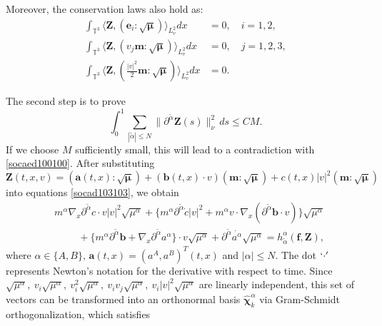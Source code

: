 \documentclass[reqno]{amsart}
\numberwithin{equation}{section}
\numberwithin{equation}{section}
\begin{document}
		Moreover, the conservation laws also hold as:
		\begin{equation}\label{conseerlawFZZ}
			\begin{aligned}
				\int_{\mathbb{T}^3} \big\langle \mathbf{Z}, (\mathbf{e}_i:\sqrt{\bm{\mu}}) \big\rangle_{L_v^2}  dx  &= 0, \quad i=1,2,\\
				\int_{\mathbb{T}^3} \big\langle \mathbf{Z}, (v_j \mathbf{m}:\sqrt{\bm{\mu}}) \big\rangle_{L_v^2} dx &= 0, \quad j=1,2,3,\\
				\int_{\mathbb{T}^3} \big\langle \mathbf{Z}, (\frac{|v|^2}{2}\mathbf{m} :\sqrt{\bm{\mu}})  \big\rangle_{L_v^2}dx &= 0.
			\end{aligned}
		\end{equation}
		
		The second step is to prove 
		\begin{equation*}
			\int_{0}^{1} \sum_{|\tilde{\alpha}| \leq N} \|\partial^{\tilde{\alpha}} \mathbf{Z}(s)\|^{2}_{\nu} \,ds \leq C M.
		\end{equation*}
		If we choose $M$ sufficiently small, this will lead to a contradiction with \eqref{socaed100100}. After substituting
		\begin{equation*}
		\mathbf{Z}(t,x,v)	= (\mathbf{a}(t,x):\sqrt{\bm{\mu}}) + (\mathbf{b}(t,x) \cdot v) (\mathbf{m}:\sqrt{\bm{\mu}}) + c(t,x)|v|^2(\mathbf{m}:\sqrt{\bm{\mu}})
		\end{equation*}
		 into equations \eqref{socad103103}, we obtain
		\begin{equation}
		\begin{aligned}
			&m^{\alpha}\nabla_{x}\partial^{\tilde{\alpha}} c \cdot v|v|^{2}\sqrt{\mu^{\alpha}} +  \{m^{\alpha}\partial^{\tilde{\alpha}} \dot{c}|v|^{2} +m^{\alpha}v \cdot \nabla_{x}(\partial^{\tilde{\alpha}}\mathbf{b} \cdot v)\}\sqrt{\mu^{\alpha}} \\
			&\hspace{1cm}+ \{m^{\alpha}\partial^{\tilde{\alpha}}\mathbf{b} + \nabla_{x}\partial^{\tilde{\alpha}} a^{\alpha}\} \cdot v\sqrt{\mu^{\alpha}} + \partial^{\tilde{\alpha}}\dot{a^{\alpha}}\sqrt{\mu^{\alpha}} = h^{\alpha}_{\tilde{\alpha}}(\mathbf{f}, \mathbf{Z}), \label{socad105105}
		\end{aligned}
		\end{equation}
		where $\alpha \in \{A,B\},\,$$\mathbf{a}(t,x)=(a^A,a^B)^T(t,x)$ and $|\alpha| \leq N$. The dot $`\cdot'$ 
		represents Newton's notation for the derivative with respect to time. 
		Since $\sqrt{\mu^{\alpha}},\ v_i\sqrt{\mu^{\alpha}},\ v_i^2\sqrt{\mu^{\alpha}},\ v_i v_j\sqrt{\mu^{\alpha}},\ v_i|v|^2\sqrt{\mu^{\alpha}}$ are linearly independent, 
		this set of vectors can be transformed into an orthonormal basis $\hat{\bm{\chi}}_k^{\alpha}$ via Gram-Schmidt orthogonalization, which satisfies
		$$
\end{document}
